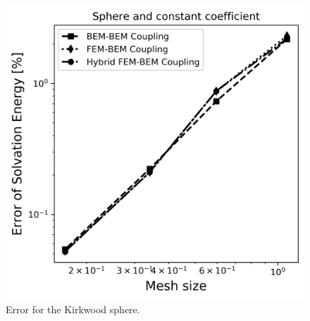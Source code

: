 \begin{figure}
  \centering
  \includegraphics[width=0.6\linewidth]{Sphere_const_coeff_error.png}
  \caption{Error for the Kirkwood sphere.}
  \label{fig:error_sphere}
\end{figure}


